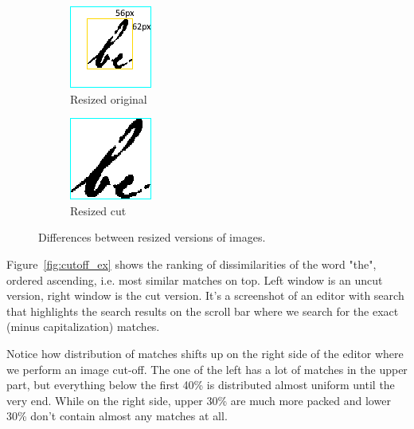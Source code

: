 \documentclass[12pt]{article}
\begin{document}
\begin{figure}
     \centering
     \begin{subfigure}[b]{0.3\textwidth}
         \centering
         \includegraphics[scale=1.0]{figs/nocut_resize.png}
         \caption{Resized original}
         \label{fig:nocut_resize}
     \end{subfigure}
     \begin{subfigure}[b]{0.3\textwidth}
         \centering
         \includegraphics[scale=1.0]{figs/cut_resize.png}
         \caption{Resized cut}
         \label{fig:cut_resize}
     \end{subfigure}
        \caption{Differences between resized versions of images.}
        \label{fig:resized}
\end{figure}

Figure~\ref{fig:cutoff_ex} shows the ranking of dissimilarities of the word "the", ordered ascending, i.e. most similar matches on top. Left window is an uncut version, right window is the cut version. It's a screenshot of an editor with search that highlights the search results on the scroll bar where we search for the exact (minus capitalization) matches.

Notice how distribution of matches shifts up on the right side of the editor where we perform an image cut-off. The one of the left has a lot of matches in the upper part, but everything below the first 40\% is distributed almost uniform until the very end. While on the right side, upper 30\% are much more packed and lower 30\% don't contain almost any matches at all.
\end{document}

